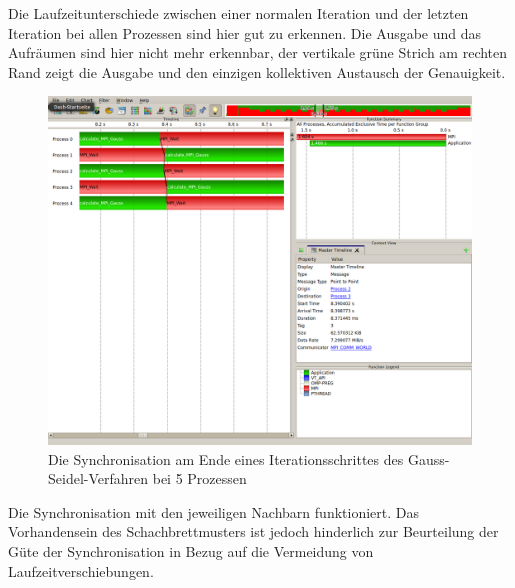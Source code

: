 \documentclass[a4paper,12pt]{scrartcl}
\begin{document}
Die Laufzeitunterschiede zwischen einer normalen Iteration und der letzten Iteration bei allen Prozessen sind hier gut zu erkennen. Die Ausgabe und das Aufräumen sind hier nicht mehr erkennbar, der vertikale grüne Strich am rechten Rand zeigt die Ausgabe und den einzigen kollektiven Austausch der Genauigkeit.
\FloatBarrier
\begin{figure}[hr!]
 \includegraphics[scale=0.45]{./5_4_GS/Syncronize.png}
 \caption{Die Synchronisation am Ende eines Iterationsschrittes des Gauss-Seidel-Verfahren bei 5 Prozessen}
\end{figure}
Die Synchronisation mit den jeweiligen Nachbarn funktioniert. Das Vorhandensein des Schachbrettmusters ist jedoch hinderlich zur Beurteilung der Güte der Synchronisation in Bezug auf die Vermeidung von Laufzeitverschiebungen.  
\newpage
\FloatBarrier
\FloatBarrier
\end{document}
